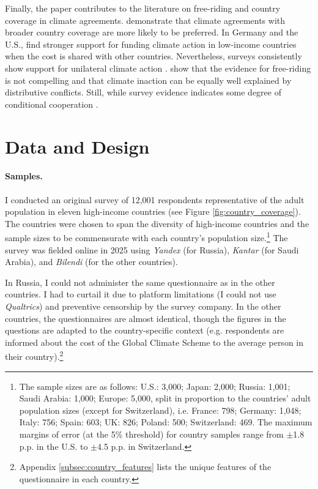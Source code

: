 \documentclass[12pt,english]{article}
\begin{document}
\begin{bibunit}
Finally, the paper contributes to the literature on free-riding and country coverage in climate agreements. \cite{beiser-mcgrath_could_2019} demonstrate that climate agreements with broader country coverage are more likely to be preferred. In Germany and the U.S., \cite{gampfer_obtaining_2014} find stronger support for funding climate action in low-income countries when the cost is shared with other countries. Nevertheless, surveys consistently show support for unilateral climate action \citep{bernauer_how_2015,mcgrath_how_2017}. \cite{aklin_prisoners_2020} show that the evidence for free-riding is not compelling and that climate inaction can be equally well explained by distributive conflicts. Still, while survey evidence indicates some degree of conditional cooperation \citep{carlsson_importance_2025,tam_they_2025}.

\section{Data and Design\label{sec:data}}

\paragraph{Samples.}
I conducted an original survey of 12,001 respondents representative of the adult population in eleven high-income countries (see Figure \ref{fig:country_coverage}). The countries were chosen to span the diversity of high-income countries and the sample sizes to be commensurate with each country's population size.\footnote{The sample sizes are as follows: U.S.: 3,000; Japan: 2,000; Russia: 1,001; Saudi Arabia: 1,000; Europe: 5,000, split in proportion to the countries' adult population sizes (except for Switzerland), i.e. France: 798; Germany: 1,048; Italy: 756; Spain: 603; UK: 826; Poland: 500; Switzerland: 469. The maximum margins of error (at the 5\% threshold) for country samples range from $\pm$1.8 p.p. in the U.S. to $\pm$4.5 p.p. in Switzerland.}
The survey was fielded online in 2025 using \textit{Yandex} (for Russia), \textit{Kantar} (for Saudi Arabia), and \textit{Bilendi} (for the other countries).%

In Russia, I could not administer the same questionnaire as in the other countries. I had to curtail it due to platform limitations (I could not use \textit{Qualtrics}) and preventive censorship by the survey company. In the other countries, the questionnaires are almost identical, though the figures in the questions are adapted to the country-specific context (e.g. respondents are informed about the cost of the Global Climate Scheme to the average person in their country).\footnote{Appendix \ref{subsec:country_features} lists the unique features of the questionnaire in each country.}


\end{bibunit}
\end{document}
